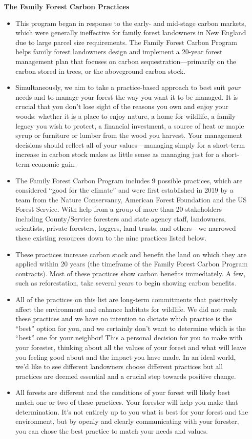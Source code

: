 \documentclass{article}\usepackage[]{graphicx}\usepackage[]{color}
\begin{document}
{\Large{\textbf{The Family Forest Carbon Practices}}}
  \begin{itemize}
  \item This program began in response to the early- and mid-stage carbon markets, which were generally ineffective for family forest landowners in New England due to large parcel size requirements. The Family Forest Carbon Program helps family forest landowners design and implement a 20-year forest management plan that focuses on carbon sequestration---primarily on the carbon stored in trees, or the aboveground carbon stock. 
  \item Simultaneously, we aim to take a practice-based approach to best suit \textit{your} needs and to manage your forest the way you want it to be managed. It is crucial that you don't lose sight of the reasons you own and enjoy your woods: whether it is a place to enjoy nature, a home for wildlife, a family legacy you wish to protect, a financial investment, a source of heat or maple syrup or furniture or lumber from the wood you harvest. Your management decisions should reflect all of your values---managing simply for a short-term increase in carbon stock makes as little sense as managing just for a short-term economic gain.
  \item The Family Forest Carbon Program includes 9 possible practices, which are considered ``good for the climate'' and were first established in 2019 by a team from the Nature Conservancy, American Forest Foundation and the US Forest Service. With help from a group of more than 20 stakeholders---including County/Service foresters and state agency staff, landowners, scientists, private foresters, loggers, land trusts, and others---we narrowed these existing resources down to the nine practices listed below. 
  \item These practices increase carbon stock and benefit the land on which they are applied within 20 years (the timeframe of the Family Forest Carbon Program contracts). Most of these practices show carbon benefits immediately. A few, such as reforestation, take several years to begin showing carbon benefits.
  \item All of the practices on this list are long-term commitments that positively affect the environment and enhance habitats for wildlife. We did not rank these practices and we have no intention to dictate which practice is the ``best'' option for you, and we certainly don't want to determine which is the ``best'' one for your neighbor! This a personal decision for you to make with your forester, thinking about all the values of your forest and what will leave you feeling good about and the impact you have made. In an ideal world, we'd like to see different landowners choose different practices but all practices are deemed essential and a crucial step towards positive change.
  \item All forests are different and the conditions of your forest will likely best match one or two of these practices. Your forester will help you make that determination. It's not entirely up to you what is best for your forest and the environment, but by openly and clearly communicating with your forester, you can chose the best practice to match your needs and values. 
  

\end{itemize}
\end{document}
